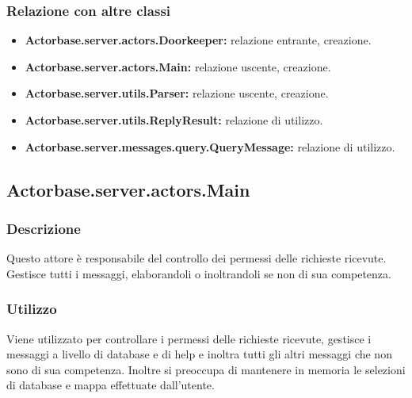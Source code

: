\documentclass[a4paper]{article}
\begin{document}
			\subsubsection{Relazione con altre classi}
				\begin{itemize}
					\item \textbf{Actorbase.server.actors.Doorkeeper:} relazione entrante, creazione.
					\item \textbf{Actorbase.server.actors.Main:} relazione uscente, creazione.
					\item \textbf{Actorbase.server.utils.Parser:} relazione uscente, creazione.
					\item \textbf{Actorbase.server.utils.ReplyResult:} relazione di utilizzo.
					\item \textbf{Actorbase.server.messages.query.QueryMessage:} relazione di utilizzo.
				\end{itemize}
				
		\subsection{Actorbase.server.actors.Main}
			\subsubsection{Descrizione}
				Questo attore è responsabile del controllo dei permessi delle richieste ricevute. Gestisce tutti i messaggi, elaborandoli o inoltrandoli 
				se non di sua competenza.
				
			\subsubsection{Utilizzo}
				Viene utilizzato per controllare i permessi delle richieste ricevute, gestisce i messaggi a livello di database e di help
				 e inoltra tutti gli altri messaggi che non sono di sua competenza. Inoltre si preoccupa di mantenere in memoria le selezioni di 
				 database e mappa effettuate dall'utente.
				
\end{document}
